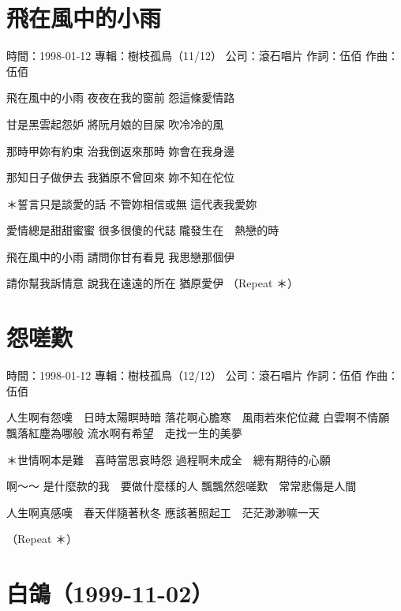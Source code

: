 \documentclass[UTF8,a4paper,oneside,twocolumn,12pt]{ctexbook}
\newcommand{\infopair}[2]{\textbullet #1：#2}
\newcommand{\zc}[1][伍佰]{\infopair{作詞}{#1}}
\newcommand{\zq}[1][伍佰]{\infopair{作曲}{#1}}
\newcommand{\zj}[1]{\infopair{專輯}{#1}}
\newcommand{\sj}[1]{\infopair{時間}{#1}}
\newcommand{\gs}[1]{\infopair{公司}{#1}}
\newenvironment{info}{\begin{flushleft}\kaishu
	}
	{\end{flushleft}\normalsize\yahei\par}
\newenvironment{lyric}{
	}
{}
\begin{document}
\section{飛在風中的小雨}
\begin{info}
	\sj{1998-01-12}
	\zj{樹枝孤鳥（11/12）}
	\gs{滾石唱片}
	\zc
	\zq
\end{info}
\begin{lyric}
	飛在風中的小雨
	夜夜在我的窗前
	怨這條愛情路

	甘是黑雲起怨妒
	將阮月娘的目屎
	吹冷冷的風

	那時甲妳有約束
	治我倒返來那時
	妳會在我身邊

	那知日子做伊去
	我猶原不曾回來
	妳不知在佗位

	＊誓言只是談愛的話
	不管妳相信或無
	這代表我愛妳

	愛情總是甜甜蜜蜜
	很多很傻的代誌
	隴發生在　熱戀的時

	飛在風中的小雨
	請問你甘有看見
	我思戀那個伊

	請你幫我訴情意
	說我在遠遠的所在
	猶原愛伊
	（Repeat ＊）
\end{lyric}

\section{怨嗟歎}
\begin{info}
	\sj{1998-01-12}
	\zj{樹枝孤鳥（12/12）}
	\gs{滾石唱片}
	\zc
	\zq
\end{info}
\begin{lyric}
	人生啊有怨嘆　日時太陽瞑時暗
	落花啊心膽寒　風雨若來佗位藏
	白雲啊不情願　飄落紅塵為哪般
	流水啊有希望　走找一生的美夢

	＊世情啊本是難　喜時當思哀時怨
	過程啊未成全　總有期待的心願

	啊～～
	是什麼款的我　要做什麼樣的人
	飄飄然怨嗟歎　常常悲傷是人間

	人生啊真感嘆　春天伴隨著秋冬
	應該著照起工　茫茫渺渺嘛一天

	（Repeat ＊）
\end{lyric}


\section*{白鴿（1999-11-02）}
\end{document}
